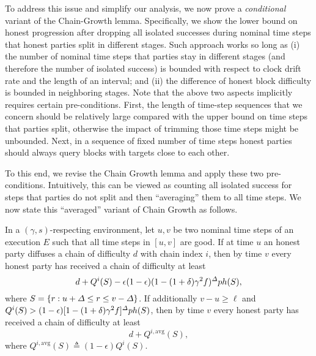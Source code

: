 To address this issue and simplify our analysis, we now prove a \emph{conditional} variant of the Chain-Growth lemma.
%
Specifically, we show the lower bound on honest progression after dropping all isolated successes during nominal time steps that honest parties split in different stages.
%
Such approach works so long as (i) the number of nominal time steps that parties stay in different stages (and therefore the number of isolated success) is bounded with respect to clock drift rate \clockDrift and the length of an interval; and (ii) the difference of honest block difficulty is bounded in neighboring stages.
%
Note that the above two aspects implicitly requires certain pre-conditions.
%
First, the length of time-step sequences that we concern should be relatively large compared with the upper bound on time steps that parties split, otherwise the impact of trimming those time steps might be unbounded.
%
Next, in a sequence of fixed number of time steps honest parties should always query blocks with targets close to each other.

To this end, we revise the Chain Growth lemma and apply these two pre-conditions.
%
Intuitively, this can be viewed as counting all isolated success for steps that parties do not split and then ``averaging'' them to all time steps.
%
We now state this ``averaged'' variant of Chain Growth as follows.

\begin{lemma} \label{lemma:averaged-chain-growth}
    In a $(\gamma, s)$-respecting environment, let $u, v$ be two nominal time steps of an execution $E$ such that all time steps in $[u, v]$ are good.
    If at time $u$ an honest party diffuses a chain of difficulty $d$ with chain index $i$, then by time $v$ every honest party has received a chain of difficulty at least
    \[ d + Q^i(S) - \epsilon(1 - \epsilon)(1 - (1 + \delta) \gamma^2 f)^\varDelta p h(S), \]
    where $S = \{r : u + \varDelta \le r \le v - \varDelta \}$.
    If additionally $v - u \ge \ell$ and $Q^i(S) > (1 - \epsilon)[1 - (1 + \delta)\gamma^2 f]^{\varDelta} p h(S)$, then by time $v$ every honest party has received a chain of difficulty at least
    \[ d + Q^{i, \mathrm{avg}}(S), \]
    where $Q^{i, \mathrm{avg}}(S) \triangleq (1 - \epsilon) Q^i(S)$.
\end{lemma}

